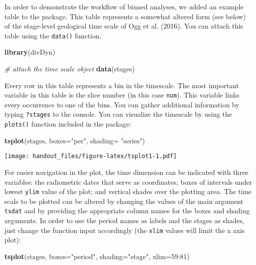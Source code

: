 \documentclass[]{article}
\newenvironment{Shaded}{\begin{snugshade}}{\end{snugshade}}
\newcommand{\KeywordTok}[1]{\textcolor[rgb]{0.13,0.29,0.53}{\textbf{{#1}}}}
\newcommand{\DataTypeTok}[1]{\textcolor[rgb]{0.13,0.29,0.53}{{#1}}}
\newcommand{\DecValTok}[1]{\textcolor[rgb]{0.00,0.00,0.81}{{#1}}}
\newcommand{\StringTok}[1]{\textcolor[rgb]{0.31,0.60,0.02}{{#1}}}
\newcommand{\CommentTok}[1]{\textcolor[rgb]{0.56,0.35,0.01}{\textit{{#1}}}}
\newcommand{\NormalTok}[1]{{#1}}
\begin{document}
In order to demonstrate the workflow of binned analyses, we added an
example table to the package. This table represents a somewhat altered
form (see below) of the stage-level geological time scale of Ogg et al.
(2016). You can attach this table using the \texttt{data()} function.

\begin{Shaded}
\begin{Highlighting}[]
\KeywordTok{library}\NormalTok{(divDyn)}
\end{Highlighting}
\end{Shaded}

\begin{Shaded}
\begin{Highlighting}[]
\CommentTok{# attach the time scale object}
\KeywordTok{data}\NormalTok{(stages)}
\end{Highlighting}
\end{Shaded}

Every row in this table represents a bin in the timescale. The most
important variable in this table is the slice number (in this case
\texttt{num}). This variable links every occurrence to one of the bins.
You can gather additional information by typing \texttt{?stages} to the
console. You can visualize the timescale by using the \texttt{plots()}
function included in the package:

\begin{Shaded}
\begin{Highlighting}[]
\KeywordTok{tsplot}\NormalTok{(stages, }\DataTypeTok{boxes=}\StringTok{"per"}\NormalTok{, }\DataTypeTok{shading=} \StringTok{"series"}\NormalTok{)}
\end{Highlighting}
\end{Shaded}

\texttt{[image: handout\_files/figure-latex/tsplot1-1.pdf]}

For easier navigation in the plot, the time dimension can be indicated
with three variables: the radiometric dates that serve as coordinates;
boxes of intervals under lowest \texttt{ylim} value of the plot; and
vertical shades over the plotting area. The time scale to be plotted can
be altered by changing the values of the main argument \texttt{tsdat}
and by providing the appropriate column names for the boxes and shading
arguments. In order to use the period names as labels and the stages as
shades, just change the function input accordingly (the \texttt{xlim}
values will limit the x axis plot):

\begin{Shaded}
\begin{Highlighting}[]
\KeywordTok{tsplot}\NormalTok{(stages, }\DataTypeTok{boxes=}\StringTok{"period"}\NormalTok{, }\DataTypeTok{shading=}\StringTok{"stage"}\NormalTok{, }\DataTypeTok{xlim=}\DecValTok{59}\NormalTok{:}\DecValTok{81}\NormalTok{)}
\end{Highlighting}
\end{Shaded}
\end{document}
